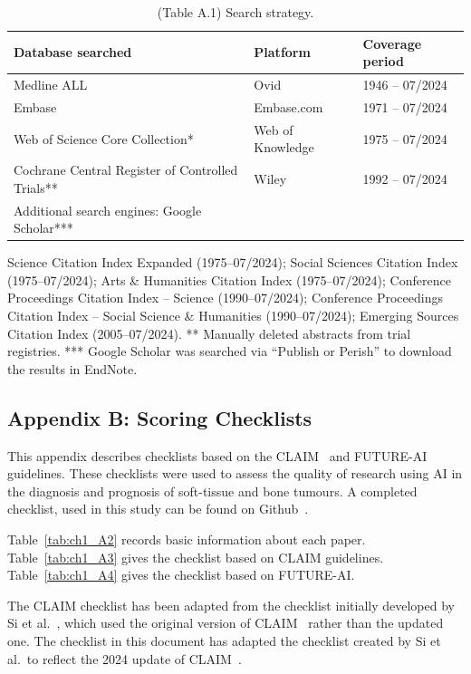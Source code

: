 \begin{table}[htbp]
	\caption{(Table A.1) Search strategy.}
	\label{tab:ch1_A1}
	\small
	\begin{tabular}{@{}p{5.4cm}p{3.2cm}p{3cm}@{}}
		\toprule
		\textbf{Database searched} & \textbf{Platform} & \textbf{Coverage period} \\
		\midrule
		Medline ALL & Ovid & 1946 -- 07/2024 \\
		Embase & Embase.com & 1971 -- 07/2024 \\
		Web of Science Core Collection* & Web of Knowledge & 1975 -- 07/2024 \\
		Cochrane Central Register of Controlled Trials** & Wiley & 1992 -- 07/2024 \\
		Additional search engines: Google Scholar*** & & \\
		\bottomrule
	\end{tabular}

	\vspace{2mm}
	\parbox{\textwidth}{\footnotesize * Science Citation Index Expanded (1975--07/2024); Social Sciences Citation Index (1975--07/2024); Arts \& Humanities Citation Index (1975--07/2024); Conference Proceedings Citation Index -- Science (1990--07/2024); Conference Proceedings Citation Index -- Social Science \& Humanities (1990--07/2024); Emerging Sources Citation Index (2005--07/2024).
	** Manually deleted abstracts from trial registries.
	*** Google Scholar was searched via ``Publish or Perish'' to download the results in EndNote.}
\end{table}

\subsection{Appendix B: Scoring Checklists}
\label{sec:ch1_appB}
This appendix describes checklists based on the CLAIM~\autocite{tejani2024} and FUTURE-AI~\autocite{lekadir2025} guidelines.
These checklists were used to assess the quality of research using AI in the diagnosis and prognosis of soft-tissue and bone tumours.
A completed checklist, used in this study can be found on Github~\autocite{spaanderman2024zenodo}.

Table~\ref{tab:ch1_A2} records basic information about each paper.
Table~\ref{tab:ch1_A3} gives the checklist based on CLAIM guidelines.
Table~\ref{tab:ch1_A4} gives the checklist based on FUTURE-AI.

The CLAIM checklist has been adapted from the checklist initially developed by Si et al.~\autocite{si2022}, which used the original version of CLAIM~\autocite{mongan2020} rather than the updated one.
The checklist in this document has adapted the checklist created by Si et al.\ to reflect the 2024 update of CLAIM~\autocite{tejani2024}.

